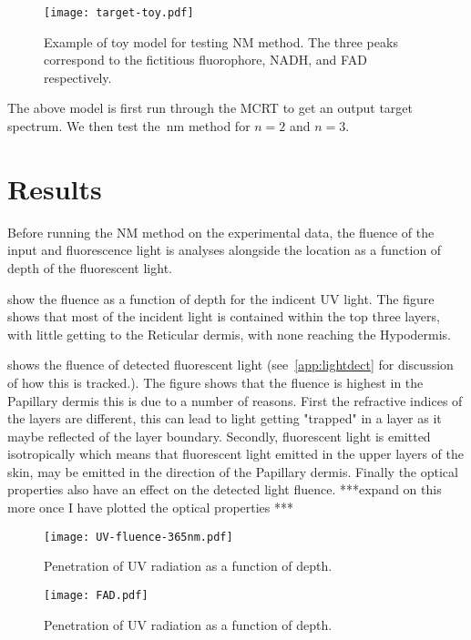 \begin{figure}[!htbp]
	\centering
	\texttt{[image: target-toy.pdf]}
	\caption{Example of toy model for testing NM method. The three peaks correspond to the fictitious fluorophore, NADH, and FAD respectively.}
	\label{fig:figure1}
\end{figure}

The above model is first run through the MCRT to get an output target spectrum.
We then test the~\gls*{nm} method for $n=2$ and $n=3$.


\section{Results}

Before running the NM method on the experimental data, the fluence of the input and fluorescence light is analyses alongside the location as a function of depth of the fluorescent light.

 show the fluence as a function of depth for the indicent UV light.
The figure shows that most of the incident light is contained within the top three layers, with little getting to the Reticular dermis, with none reaching the Hypodermis.

 shows the fluence of detected fluorescent light (see~\cref{app:lightdect} for discussion of how this is tracked.).
The figure shows that the fluence is highest in the Papillary dermis this is due to a number of reasons.
First the refractive indices of the layers are different, this can lead to light getting "trapped" in a layer as it maybe reflected of the layer boundary.
Secondly, fluorescent light is emitted isotropically which means that fluorescent light emitted in the upper layers of the skin, may be emitted in the direction of the Papillary dermis.
Finally the optical properties also have an effect on the detected light fluence.
***expand on this more once I have plotted the optical properties ***

\begin{figure}[!htpb]
    \centering
    \texttt{[image: UV-fluence-365nm.pdf]}
    \caption{Penetration of UV radiation as a function of depth.}
    \label{fig:uvpen}
\end{figure}

\begin{figure}[!htpb]
    \centering
    \texttt{[image: FAD.pdf]}
    \caption{Penetration of UV radiation as a function of depth.}
    \label{fig:fadnadhboth}
\end{figure}


